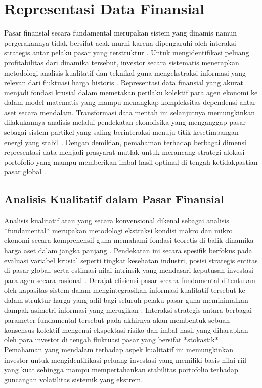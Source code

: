\section{Representasi Data Finansial}
Pasar finansial secara fundamental merupakan sistem yang dinamis namun pergerakannya tidak bersifat acak murni karena dipengaruhi oleh interaksi strategis antar pelaku pasar yang terstruktur \cite{schwert_chapter_2003}. Untuk mengidentifikasi peluang profitabilitas dari dinamika tersebut, investor secara sistematis menerapkan metodologi analisis kualitatif dan teknikal guna mengekstraksi informasi yang relevan dari fluktuasi harga historis \cite{freitas_game_2024}. Representasi data finansial yang akurat menjadi fondasi krusial dalam memetakan perilaku kolektif para agen ekonomi ke dalam model matematis yang mampu menangkap kompleksitas dependensi antar aset secara mendalam. Transformasi data mentah ini selanjutnya memungkinkan dilakukannya analisis melalui pendekatan ekonofisika yang menganggap pasar sebagai sistem partikel yang saling berinteraksi menuju titik kesetimbangan energi yang stabil \cite{hidalgo_quantum_2006}. Dengan demikian, pemahaman terhadap berbagai dimensi representasi data menjadi prasyarat mutlak untuk merancang strategi alokasi portofolio yang mampu memberikan imbal hasil optimal di tengah ketidakpastian pasar global \cite{markowitz_portfolio_1952}.

\subsection{Analisis Kualitatif dalam Pasar Finansial}
Analisis kualitatif atau yang secara konvensional dikenal sebagai analisis *fundamental* merupakan metodologi ekstraksi kondisi makro dan mikro ekonomi secara komprehensif guna memahami fondasi teoretis di balik dinamika harga aset dalam jangka panjang \cite{schwert_chapter_2003}. Pendekatan ini secara spesifik berfokus pada evaluasi variabel krusial seperti tingkat kesehatan industri, posisi strategis entitas di pasar global, serta estimasi nilai intrinsik yang mendasari keputusan investasi para agen secara rasional \cite{markowitz_portfolio_1952}. Derajat efisiensi pasar secara fundamental ditentukan oleh kapasitas sistem dalam mengintegrasikan informasi kualitatif tersebut ke dalam struktur harga yang adil bagi seluruh pelaku pasar guna meminimalkan dampak asimetri informasi yang merugikan \cite{schwert_chapter_2003}. Interaksi strategis antara berbagai parameter fundamental tersebut pada akhirnya akan membentuk sebuah konsensus kolektif mengenai ekspektasi risiko dan imbal hasil yang diharapkan oleh para investor di tengah fluktuasi pasar yang bersifat *stokastik* \cite{sikalo_efficient_2022}. Pemahaman yang mendalam terhadap aspek kualitatif ini memungkinkan investor untuk mengidentifikasi peluang investasi yang memiliki basis nilai riil yang kuat sehingga mampu mempertahankan stabilitas portofolio terhadap guncangan volatilitas sistemik yang ekstrem.

